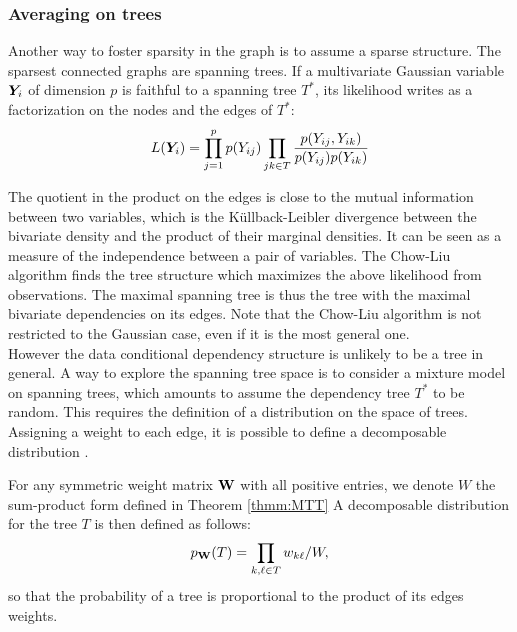 
 
 \subsubsection{Averaging on trees}\label{tree:aver}

  Another way to foster sparsity in the graph is to assume a sparse structure. The sparsest connected graphs are spanning trees. If a multivariate Gaussian variable ${\boldsymbol{Y}}_i$ of dimension $p$  is faithful to a spanning tree $T ^*$, its likelihood writes as a factorization on the nodes and the edges of $T^*$:
  $$L({\boldsymbol{Y}}_i) = \prod_{j=1}^p p(Y_{ij}) \prod_{jk\in T} \frac{p(Y_{ij},Y_{ik})}{p(Y_{ij})p(Y_{ik})}$$

The quotient in the product on the edges is close to the mutual information between two variables, which is the Küllback-Leibler divergence between the bivariate density and the product of their marginal densities. It can be seen as a measure of the independence between a pair of variables.   The Chow-Liu algorithm \citep{ChowLiu} finds the tree structure which maximizes the above likelihood from observations. The maximal spanning tree is thus the tree with the maximal bivariate dependencies on its edges. Note that the Chow-Liu algorithm is not restricted to the Gaussian case, even if it is the most general one.\\
 

However the data conditional dependency structure is unlikely to be a tree in general. A way to explore the spanning tree space is to consider a mixture model on spanning trees, which amounts to assume the dependency tree $T^*$ to be random. This requires the definition of a distribution on the space of trees. Assigning a weight to each edge, it is possible to define a decomposable distribution \citep{MixtTrees,MeilaJaak}.
\begin{definition} 
For any symmetric weight matrix ${\bf W}$ with all positive entries, we denote $W$ the sum-product form defined in Theorem \ref{thmm:MTT} A decomposable  distribution for the tree $T$ is then defined as follows:
$$p_{{\bf W}}(T) = \prod_{k,\ell \in T} w_{k\ell} / W ,$$
so that the probability of a tree is proportional to the product of its edges weights.
\end{definition}


